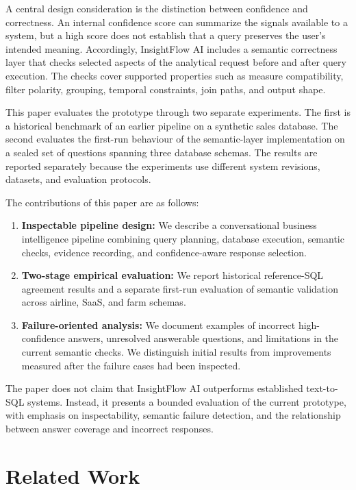 \documentclass[conference]{IEEEtran}
\begin{document}
A central design consideration is the distinction between confidence and correctness. An internal confidence score can summarize the signals available to a system, but a high score does not establish that a query preserves the user's intended meaning. Accordingly, InsightFlow AI includes a semantic correctness layer that checks selected aspects of the analytical request before and after query execution. The checks cover supported properties such as measure compatibility, filter polarity, grouping, temporal constraints, join paths, and output shape.

This paper evaluates the prototype through two separate experiments. The first is a historical benchmark of an earlier pipeline on a synthetic sales database. The second evaluates the first-run behaviour of the semantic-layer implementation on a sealed set of questions spanning three database schemas. The results are reported separately because the experiments use different system revisions, datasets, and evaluation protocols.

The contributions of this paper are as follows:

\begin{enumerate}
\def\labelenumi{\arabic{enumi}.}
\item
  \textbf{Inspectable pipeline design:} We describe a conversational business intelligence pipeline combining query planning, database execution, semantic checks, evidence recording, and confidence-aware response selection.
\item
  \textbf{Two-stage empirical evaluation:} We report historical reference-SQL agreement results and a separate first-run evaluation of semantic validation across airline, SaaS, and farm schemas.
\item
  \textbf{Failure-oriented analysis:} We document examples of incorrect high-confidence answers, unresolved answerable questions, and limitations in the current semantic checks. We distinguish initial results from improvements measured after the failure cases had been inspected.
\end{enumerate}

The paper does not claim that InsightFlow AI outperforms established text-to-SQL systems. Instead, it presents a bounded evaluation of the current prototype, with emphasis on inspectability, semantic failure detection, and the relationship between answer coverage and incorrect responses.

\section{Related Work}
\end{document}
